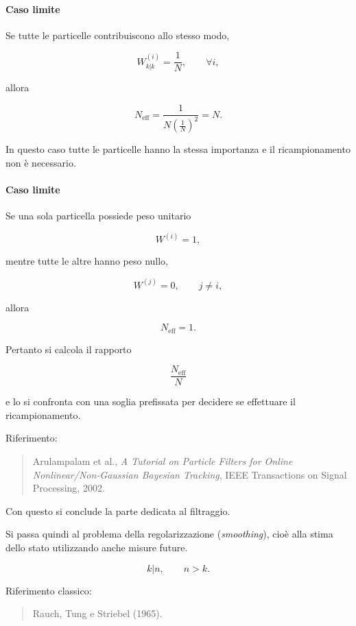 \documentclass[11pt,a4paper]{article}
\begin{document}
\bigskip

\paragraph{Caso limite}

Se tutte le particelle contribuiscono allo stesso modo,

\[
W^{(i)}_{k|k}
=
\frac1N,
\qquad
\forall i,
\]

allora

\[
N_{\mathrm{eff}}
=
\frac{1}
{N\left(\frac1N\right)^2}
=
N.
\]

In questo caso tutte le particelle hanno la stessa importanza e il
ricampionamento non è necessario.

\paragraph{Caso limite}

Se una sola particella possiede peso unitario

\[
W^{(i)}=1,
\]

mentre tutte le altre hanno peso nullo,

\[
W^{(j)}=0,
\qquad
j\neq i,
\]

allora

\[
N_{\mathrm{eff}}=1.
\]

Pertanto si calcola il rapporto

\[
\frac{N_{\mathrm{eff}}}{N}
\]

e lo si confronta con una soglia prefissata per decidere se effettuare il
ricampionamento.

\vspace{0.5em}

Riferimento:

\begin{quote}
Arulampalam et al., \emph{A Tutorial on Particle Filters for Online
Nonlinear/Non-Gaussian Bayesian Tracking}, IEEE Transactions on Signal
Processing, 2002.
\end{quote}

Con questo si conclude la parte dedicata al filtraggio.

\bigskip

Si passa quindi al problema della regolarizzazione
(\emph{smoothing}), cioè alla stima dello stato utilizzando anche misure
future.

\[
k|n,
\qquad n>k.
\]

Riferimento classico:

\begin{quote}
Rauch, Tung e Striebel (1965).
\end{quote}
\end{document}
